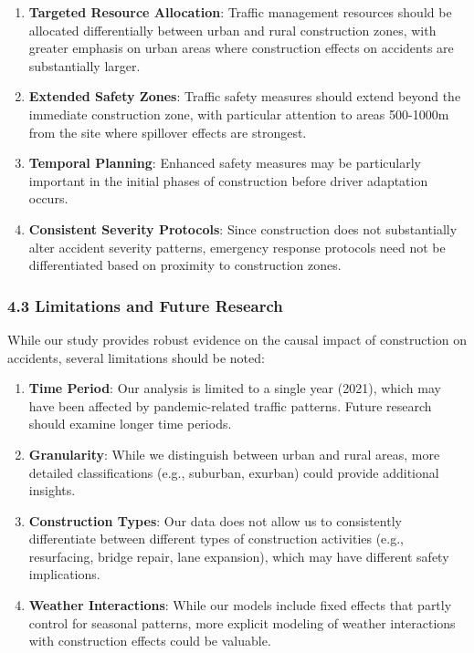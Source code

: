 \documentclass[
]{article}
\begin{document}
\begin{enumerate}
\def\labelenumi{\arabic{enumi}.}
\item
  \textbf{Targeted Resource Allocation}: Traffic management resources
  should be allocated differentially between urban and rural
  construction zones, with greater emphasis on urban areas where
  construction effects on accidents are substantially larger.
\item
  \textbf{Extended Safety Zones}: Traffic safety measures should extend
  beyond the immediate construction zone, with particular attention to
  areas 500-1000m from the site where spillover effects are strongest.
\item
  \textbf{Temporal Planning}: Enhanced safety measures may be
  particularly important in the initial phases of construction before
  driver adaptation occurs.
\item
  \textbf{Consistent Severity Protocols}: Since construction does not
  substantially alter accident severity patterns, emergency response
  protocols need not be differentiated based on proximity to
  construction zones.
\end{enumerate}

\subsubsection{4.3 Limitations and Future
Research}\label{limitations-and-future-research}

While our study provides robust evidence on the causal impact of
construction on accidents, several limitations should be noted:

\begin{enumerate}
\def\labelenumi{\arabic{enumi}.}
\item
  \textbf{Time Period}: Our analysis is limited to a single year (2021),
  which may have been affected by pandemic-related traffic patterns.
  Future research should examine longer time periods.
\item
  \textbf{Granularity}: While we distinguish between urban and rural
  areas, more detailed classifications (e.g., suburban, exurban) could
  provide additional insights.
\item
  \textbf{Construction Types}: Our data does not allow us to
  consistently differentiate between different types of construction
  activities (e.g., resurfacing, bridge repair, lane expansion), which
  may have different safety implications.
\item
  \textbf{Weather Interactions}: While our models include fixed effects
  that partly control for seasonal patterns, more explicit modeling of
  weather interactions with construction effects could be valuable.
\end{enumerate}
\end{document}
